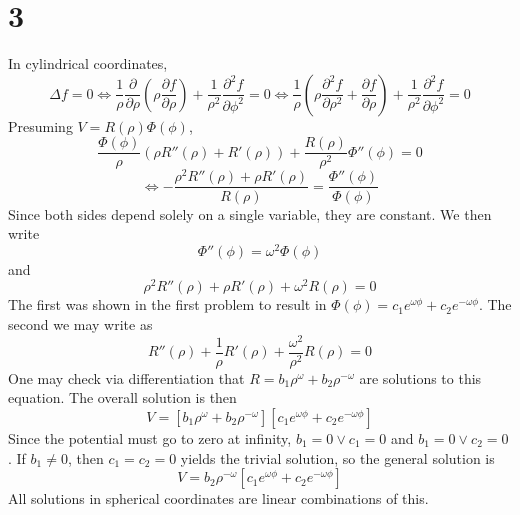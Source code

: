 \documentclass{article}
\begin{document}
\section*{3}
In cylindrical coordinates,
\[\Delta f = 0 \Leftrightarrow \frac{1}{\rho}\frac{\partial }{\partial \rho}\left( \rho\frac{\partial f}{\partial \rho} \right)+\frac{1}{\rho^2}\frac{\partial^2f}{\partial \phi^2}=0\Leftrightarrow \frac{1}{\rho}\left( \rho\frac{\partial^2 f}{\partial \rho^2}+\frac{\partial f}{\partial\rho}\right)+\frac{1}{\rho^2}\frac{\partial ^2 f}{\partial \phi^2}=0\]
Presuming $V=R(\rho)\Phi(\phi)$,
\[\frac{\Phi(\phi)}{\rho}\left( \rho R''(\rho)+R'(\rho)\right)+\frac{R(\rho)}{\rho^2}\Phi''(\phi)=0\]
\[\Leftrightarrow -\frac{\rho^2 R''(\rho)+\rho R'(\rho)}{R(\rho)}=\frac{\Phi''(\phi)}{\Phi(\phi)}\]
Since both sides depend solely on a single variable, they are constant. We then write
\[\Phi''(\phi)=\omega^2\Phi(\phi)\]
and
\[\rho^2R''(\rho)+\rho R'(\rho)+\omega^2R(\rho)=0\]
The first was shown in the first problem to result in $\Phi(\phi)=c_1e^{\omega \phi}+c_2e^{-\omega\phi}$.
The second we may write as \[R''(\rho)+\frac{1}{\rho} R'(\rho)+\frac{\omega^2}{\rho^2}R(\rho)=0\]
One may check via differentiation that $R=b_1\rho^\omega+b_2\rho^{-\omega}$ are solutions to this equation. The overall solution is then
\[V=[b_1\rho^\omega+b_2\rho^{-\omega}]\left[ c_1e^{\omega\phi}+c_2e^{-\omega\phi} \right]\]
Since the potential must go to zero at infinity, $b_1=0\lor c_1=0$ and $b_1=0\lor c_2=0$. If $b_1\neq 0$, then $c_1=c_2=0 $ yields the trivial solution, so the general solution is
\[V=b_2\rho^{-\omega}\left[ c_1e^{\omega\phi}+c_2e^{-\omega\phi} \right]\]
All solutions in spherical coordinates are linear combinations of this.
\end{document}
